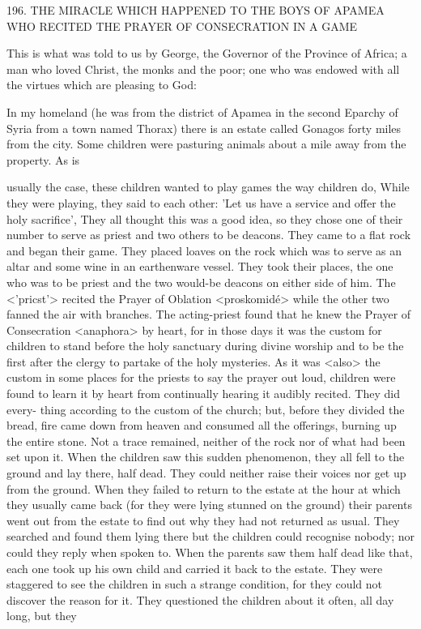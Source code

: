 196.
THE MIRACLE WHICH HAPPENED
TO THE BOYS OF APAMEA
WHO RECITED THE PRAYER OF CONSECRATION
IN A GAME

This is what was told to us by George, the Governor of the
Province of Africa; a man who loved Christ, the monks and the
poor; one who was endowed with all the virtues which are pleasing
to God:

In my homeland (he was from the district of Apamea in the second
Eparchy of Syria from a town named Thorax) there is an estate
called Gonagos forty miles from the city.
Some children were
pasturing animals about a mile away from the property.
As is

usually the case, these children wanted to play games the way
children do, While they were playing, they said to each other: 'Let
us have a service and offer the holy sacrifice', They all thought this
was a good idea, so they chose one of their number to serve as
priest and two others to be deacons.
They came to a flat rock and
began their game.
They placed loaves on the rock which was to
serve as an altar and some wine in an earthenware vessel.
They took
their places, the one who was to be priest and the two would-be
deacons on either side of him.
The <'pricst'> recited the Prayer of
Oblation <proskomidé> while the other two fanned the air with
branches.
The acting-priest found that he knew the Prayer of
Consecration <anaphora> by heart, for in those days it was the
custom for children to stand before the holy sanctuary during divine
worship and to be the first after the clergy to partake of the holy
mysteries.
As it was <also> the custom in some places for the
priests to say the prayer out loud, children were found to learn it by
heart from continually hearing it audibly recited.
They did every-
thing according to the custom of the church; but, before they
divided the bread, fire came down from heaven and consumed all
the offerings, burning up the entire stone.
Not a trace remained,
neither of the rock nor of what had been set upon it.
When the
children saw this sudden phenomenon, they all fell to the ground
and lay there, half dead.
They could neither raise their voices nor
get up from the ground.
When they failed to return to the estate at
the hour at which they usually came back (for they were lying
stunned on the ground) their parents went out from the estate to
find out why they had not returned as usual.
They searched and
found them lying there but the children could recognise nobody; nor
could they reply when spoken to.
When the parents saw them half
dead like that, each one took up his own child and carried it back
to the estate.
They were staggered to see the children in such a
strange condition, for they could not discover the reason for it.
They questioned the children about it often, all day long, but they

